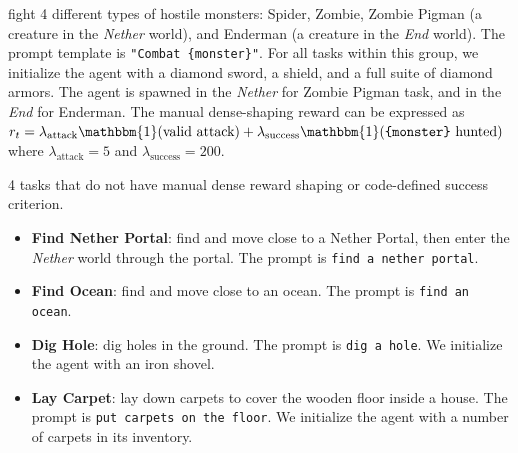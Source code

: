  fight 4 different types of hostile monsters: Spider, Zombie, Zombie Pigman (a creature in the \textit{Nether} world), and Enderman (a creature in the \textit{End} world). The prompt template is \texttt{"Combat \{monster\}"}.
For all tasks within this group, we initialize the agent with a diamond sword, a shield, and a full suite of diamond armors. The agent is spawned in the \textit{Nether} for Zombie Pigman task, and in the \textit{End} for Enderman.
The manual dense-shaping reward can be expressed as $r_t = \lambda_{\text{attack}} \mathbbm{1}(\text{valid attack}) + \lambda_{\text{success}} \mathbbm{1}(\texttt{\{monster\}}\text{ hunted})$ where $\lambda_{\text{attack}} = 5$ and $\lambda_{\text{success}} = 200$.

 4 tasks that do not have manual dense reward shaping or code-defined success criterion.

\begin{itemize}
    \item \textbf{Find Nether Portal}: find and move close to a Nether Portal, then enter the \textit{Nether} world through the portal. The prompt is \texttt{find a nether portal}. 
    \item \textbf{Find Ocean}: find and move close to an ocean. The prompt is \texttt{find an ocean}. 
    \item \textbf{Dig Hole}: dig holes in the ground. The prompt is \texttt{dig a hole}. We initialize the agent with an iron shovel.
    \item \textbf{Lay Carpet}: lay down carpets to cover the wooden floor inside a house. The prompt is \texttt{put carpets on the floor}. We initialize the agent with a number of carpets in its inventory. 
\end{itemize}


